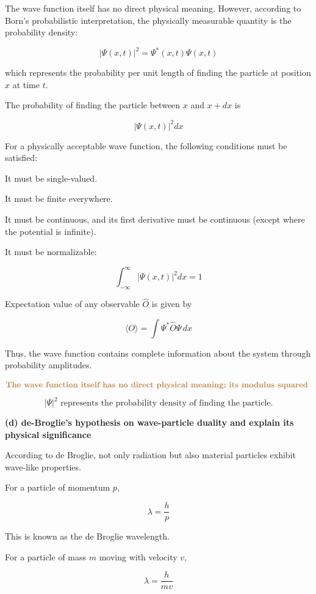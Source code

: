 \documentclass[a4paper, 12pt]{article}
\begin{document}
The wave function itself has no direct physical meaning. However, according to Born’s probabilistic interpretation, the physically measurable quantity is the probability density:

\[
|\Psi(x,t)|^2 = \Psi^*(x,t)\Psi(x,t)
\]

which represents the probability per unit length of finding the particle at position $x$ at time $t$.

The probability of finding the particle between $x$ and $x+dx$ is

\[
|\Psi(x,t)|^2 dx
\]

For a physically acceptable wave function, the following conditions must be satisfied:

It must be single-valued.

It must be finite everywhere.

It must be continuous, and its first derivative must be continuous (except where the potential is infinite).

It must be normalizable:

\[
\int_{-\infty}^{\infty} |\Psi(x,t)|^2 dx = 1
\]

Expectation value of any observable $\hat{O}$ is given by

\[
\langle O \rangle = \int \Psi^* \hat{O} \Psi \, dx
\]

Thus, the wave function contains complete information about the system through probability amplitudes.

\[
\textcolor{brown}{\textbf{The wave function itself has no direct physical meaning; its modulus squared }}
\]
\[ |\Psi|^2 \text{ represents the probability density of finding the particle.}\]

\vspace{0.8cm}

\textbf{(d) de-Broglie's hypothesis on wave-particle duality and explain its physical significance}

According to de Broglie, not only radiation but also material particles exhibit wave-like properties.

For a particle of momentum $p$,

\[
\lambda = \frac{h}{p}
\]

This is known as the de Broglie wavelength.

For a particle of mass $m$ moving with velocity $v$,

\[
\lambda = \frac{h}{mv}
\]
\end{document}
